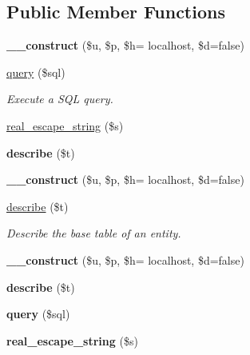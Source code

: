 \subsection*{Public Member Functions}
\begin{DoxyCompactItemize}
\item 
\hypertarget{classstore_ac6766462e1ba4cf747c89153c158e856}{}{\bfseries \+\_\+\+\_\+construct} (\$u, \$p, \$h= \textquotesingle{}localhost\textquotesingle{}, \$d=false)\label{classstore_ac6766462e1ba4cf747c89153c158e856}

\item 
\hyperlink{classstore_a65f535dfea7bcca33de5078d2bd8f18a}{query} (\$sql)
\begin{DoxyCompactList}\small\item\em Execute a S\+Q\+L query. \end{DoxyCompactList}\item 
\hyperlink{classstore_a5ba951e504b410d9442d120e9492393c}{real\+\_\+escape\+\_\+string} (\$s)
\item 
\hypertarget{classstore_ac69e064cf1e0228d17a98c91d19bc627}{}{\bfseries describe} (\$t)\label{classstore_ac69e064cf1e0228d17a98c91d19bc627}

\item 
\hypertarget{classstore_ac6766462e1ba4cf747c89153c158e856}{}{\bfseries \+\_\+\+\_\+construct} (\$u, \$p, \$h= \textquotesingle{}localhost\textquotesingle{}, \$d=false)\label{classstore_ac6766462e1ba4cf747c89153c158e856}

\item 
\hyperlink{classstore_ac69e064cf1e0228d17a98c91d19bc627}{describe} (\$t)
\begin{DoxyCompactList}\small\item\em Describe the base table of an entity. \end{DoxyCompactList}\item 
\hypertarget{classstore_ac6766462e1ba4cf747c89153c158e856}{}{\bfseries \+\_\+\+\_\+construct} (\$u, \$p, \$h= \textquotesingle{}localhost\textquotesingle{}, \$d=false)\label{classstore_ac6766462e1ba4cf747c89153c158e856}

\item 
\hypertarget{classstore_ac69e064cf1e0228d17a98c91d19bc627}{}{\bfseries describe} (\$t)\label{classstore_ac69e064cf1e0228d17a98c91d19bc627}

\item 
\hypertarget{classstore_a65f535dfea7bcca33de5078d2bd8f18a}{}{\bfseries query} (\$sql)\label{classstore_a65f535dfea7bcca33de5078d2bd8f18a}

\item 
\hypertarget{classstore_a5ba951e504b410d9442d120e9492393c}{}{\bfseries real\+\_\+escape\+\_\+string} (\$s)\label{classstore_a5ba951e504b410d9442d120e9492393c}

\end{DoxyCompactItemize}
